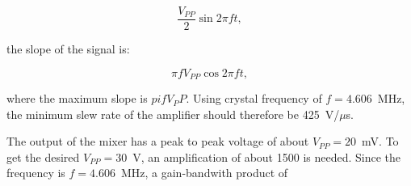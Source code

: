 $$\frac{V_{PP}}{2} \sin{2\pi ft},$$

the slope of the signal is:

\begin{equation}\label{eq:driving}
\pi fV_{PP} \cos{2\pi ft},
\end{equation}

where the maximum slope is $pi fV_PP$. Using crystal frequency of $f=4.606$~MHz, the minimum slew rate of the amplifier should therefore be 425~V/$\mu$s. 

The output of the mixer has a peak to peak voltage of about $V_{PP} = 20$~mV. To get the desired $V_{PP} = 30$~V, an amplification of about 1500 is needed. Since the frequency is $f=4.606$~MHz, a gain-bandwith product of 